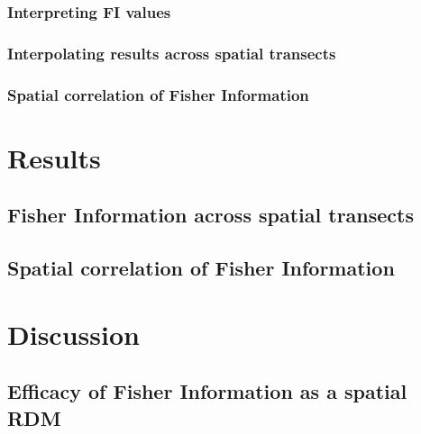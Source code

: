 \documentclass[12pt,twoside,openany]{reedthesis}
\begin{document}
\hypertarget{interpreting-fi-values}{%
\subsubsection{Interpreting FI values}\label{interpreting-fi-values}}

\hypertarget{interpolating-results-across-spatial-transects}{%
\subsubsection{Interpolating results across spatial transects}\label{interpolating-results-across-spatial-transects}}

\hypertarget{spatial-correlation-of-fisher-information}{%
\subsubsection{Spatial correlation of Fisher Information}\label{spatial-correlation-of-fisher-information}}

\hypertarget{results-1}{%
\section{Results}\label{results-1}}

\hypertarget{fisher-information-across-spatial-transects}{%
\subsection{Fisher Information across spatial transects}\label{fisher-information-across-spatial-transects}}

\hypertarget{spatial-correlation-of-fisher-information-1}{%
\subsection{Spatial correlation of Fisher Information}\label{spatial-correlation-of-fisher-information-1}}

\hypertarget{discussion-1}{%
\section{Discussion}\label{discussion-1}}

\hypertarget{efficacy-of-fisher-information-as-a-spatial-rdm}{%
\subsection{Efficacy of Fisher Information as a spatial RDM}\label{efficacy-of-fisher-information-as-a-spatial-rdm}}
\end{document}
